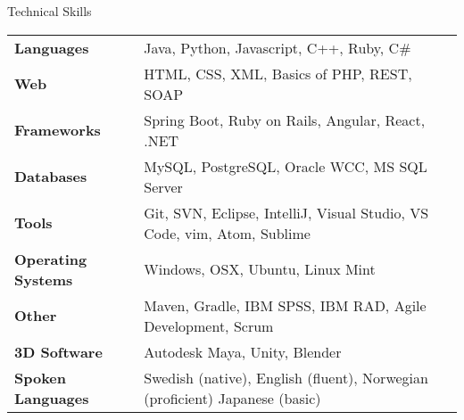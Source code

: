 \documentclass{resume} %
\begin{document}

\begin{rSection}{Technical Skills}

\begin{tabular}{ @{} >{\bfseries}l @{\hspace{6ex}} l }
Languages & Java, Python, Javascript, C++, Ruby, C\# \\
Web & HTML, CSS, XML, Basics of PHP, REST, SOAP \\
Frameworks & Spring Boot, Ruby on Rails, Angular, React, .NET \\
Databases & MySQL, PostgreSQL, Oracle WCC, MS SQL Server \\
Tools & Git, SVN, Eclipse, IntelliJ, Visual Studio, VS Code, vim, Atom, Sublime \\
Operating Systems & Windows, OSX, Ubuntu, Linux Mint \\
Other & Maven, Gradle, IBM SPSS, IBM RAD, Agile Development, Scrum \\
3D Software & Autodesk Maya, Unity, Blender \\
Spoken Languages & Swedish (native), English (fluent), Norwegian (proficient) Japanese (basic) \\
\end{tabular}

\end{rSection}





\end{document}

